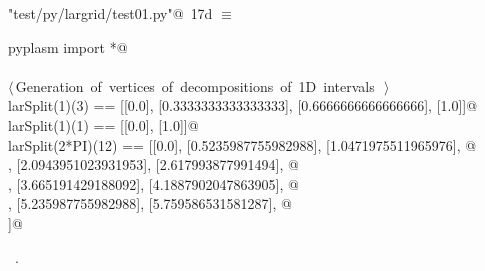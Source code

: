 \documentclass[11pt,oneside]{article}	%
\begin{document}
\begin{flushleft} \small \label{scrap29}
\protect{}\verb@"test/py/largrid/test01.py"@\nobreak\ {\footnotesize 17d }$\equiv$
\vspace{-1ex}
\begin{list}{}{} \item
\mbox{}\verb@from pyplasm import *@\\
\mbox{}\verb@@\\
\mbox{}\verb@@\hbox{$\langle\,$Generation of vertices of decompositions of 1D intervals\nobreak\ {\footnotesize {}}$\,\rangle$}\verb@@\\
\mbox{}\verb@assert larSplit(1)(3) == [[0.0], [0.3333333333333333], [0.6666666666666666], [1.0]]@\\
\mbox{}\verb@assert larSplit(1)(1) == [[0.0], [1.0]]@\\
\mbox{}\verb@assert larSplit(2*PI)(12) == [[0.0], [0.5235987755982988], [1.0471975511965976], @\\
\mbox{}\verb@[1.5707963267948966], [2.0943951023931953], [2.617993877991494], @\\
\mbox{}\verb@[3.141592653589793], [3.665191429188092], [4.1887902047863905], @\\
\mbox{}\verb@[4.71238898038469], [5.235987755982988], [5.759586531581287], @\\
\mbox{}\verb@[6.283185307179586]]@\\
\mbox{}\verb@@{\NWsep}
\end{list}
\vspace{-1ex}
\footnotesize\addtolength{\baselineskip}{-1ex}
\begin{list}{}{\setlength{\itemsep}{-\parsep}\setlength{\itemindent}{-\leftmargin}}
\item \NWtxtFileDefBy\ .
\end{list}
\end{flushleft}
\end{document}
